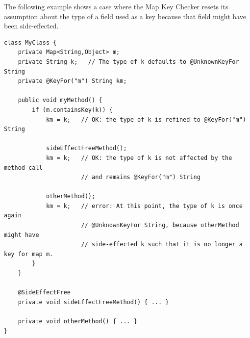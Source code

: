 The following example shows a case where the Map Key Checker resets its
assumption about the type of a field used as a key because that field might have
been side-effected.

\begin{verbatim}
class MyClass {
    private Map<String,Object> m;
    private String k;   // The type of k defaults to @UnknownKeyFor String
    private @KeyFor("m") String km;

    public void myMethod() {
        if (m.containsKey(k)) {
            km = k;   // OK: the type of k is refined to @KeyFor("m") String

            sideEffectFreeMethod();
            km = k;   // OK: the type of k is not affected by the method call
                      // and remains @KeyFor("m") String

            otherMethod();
            km = k;   // error: At this point, the type of k is once again
                      // @UnknownKeyFor String, because otherMethod might have
                      // side-effected k such that it is no longer a key for map m.
        }
    }

    @SideEffectFree
    private void sideEffectFreeMethod() { ... }

    private void otherMethod() { ... }
}
\end{verbatim}


